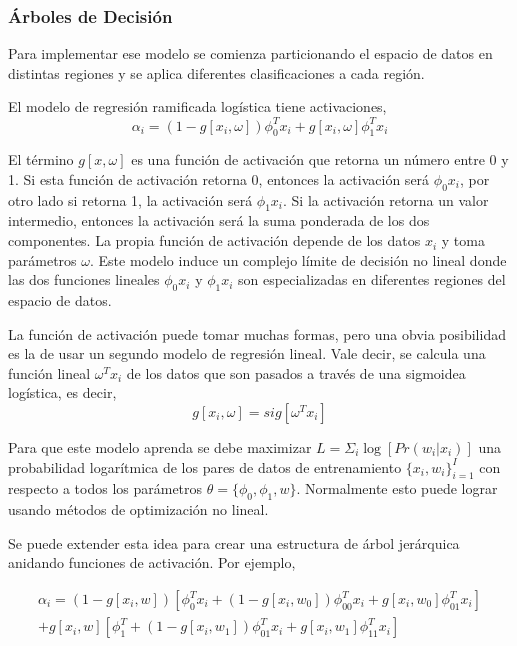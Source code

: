 \documentclass[letter,12pt]{report}
\begin{document}
\subsubsection{Árboles de Decisión}
Para implementar ese modelo \cite{Trees} se comienza particionando el espacio de datos en
distintas regiones y se aplica diferentes clasificaciones a cada región.

El modelo de regresión ramificada logística tiene activaciones,
$$\alpha_i=(1-g[x_i,\omega])\phi_0^T x_i+g[x_i,\omega]\phi_1^T x_i$$

El término $g[x,\omega]$ es una función de activación que retorna un número entre 0 y 1.
Si esta función de activación retorna 0, entonces la activación será $\phi_0x_i$, por
otro lado si retorna 1, la activación será $\phi_1x_i$. Si la activación retorna un valor
intermedio, entonces la activación será la suma ponderada de los dos componentes. La
propia función de activación depende de los datos $x_i$ y toma parámetros $\omega$. Este
modelo induce un complejo límite de decisión no lineal donde las dos funciones lineales
$\phi_0x_i$ y $\phi_1x_i$ son especializadas en diferentes regiones del espacio de datos.

La función de activación puede tomar muchas formas, pero una obvia posibilidad es la de
usar un segundo modelo de regresión lineal. Vale decir, se calcula una función lineal
$\omega^Tx_i$ de los datos que son pasados a través de una sigmoidea logística, es decir,
$$g[x_i,\omega]=sig[\omega^Tx_i]$$

Para que este modelo aprenda se debe maximizar $L = \Sigma_i \log[Pr(w_i|x_i)]$ una
probabilidad logarítmica de los pares de datos de entrenamiento $\{x_i,w_i\}_{i=1}^I$ con
respecto a todos los parámetros $\theta=\{\phi_0,\phi_1,w\}$. Normalmente esto puede
lograr usando métodos de optimización no lineal.

Se puede extender esta idea para crear una estructura de árbol jerárquica anidando
funciones de activación. Por ejemplo,

\begin{equation}
    \begin{split}
        \alpha_i = (1-g[x_i, w]) \left[\phi_0^Tx_i+(1 - g[x_i,
        w_0])\phi_{00}^Tx_i+g[x_i,w_0]\phi_{01}^Tx_i\right] \\
        + g[x_i,w]\left[\phi_1^T + (1 -
        g[x_i, w_1])\phi_{01}^Tx_i + g[x_i, w_1]\phi_{11}^Tx_i\right]
    \end{split}
\end{equation}
\end{document}
